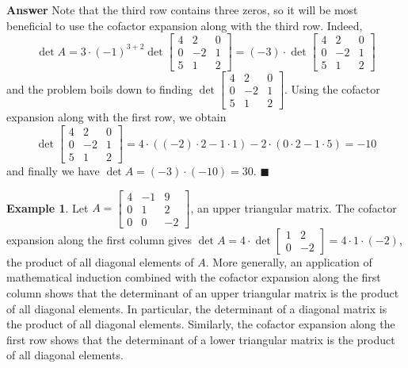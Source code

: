 \documentclass[12pt,letterpaper]{book}
\numberwithin{equation}{section}
\theoremstyle{definition}
\newtheorem{example}[thm]{\textbf{Example}}
\newenvironment{answer}{\noindent\textbf{Answer}}{\hfill$\blacksquare$\vspace{0.1in}}
\begin{document}
\begin{answer}
Note that the third row contains three zeros, so it will be most beneficial to use the cofactor expansion along with the third row. Indeed,
$$\det A=3\cdot(-1)^{3+2}\det \left[\begin{array}{rrr} 4 & 2 & 0 \\ 0 & -2 & 1 \\ 5 & 1 & 2 \end{array}\right]=(-3)\cdot\det \left[\begin{array}{rrr} 4 & 2 & 0 \\ 0 & -2 & 1 \\ 5 & 1 & 2 \end{array}\right]$$ and the problem boils down to finding $\det \left[\begin{array}{rrr} 4 & 2 & 0 \\ 0 & -2 & 1 \\ 5 & 1 & 2 \end{array}\right]$. Using the cofactor expansion along with the first row, we obtain
$$\det \left[\begin{array}{rrr} 4 & 2 & 0 \\ 0 & -2 & 1 \\ 5 & 1 & 2 \end{array}\right]=4\cdot((-2)\cdot 2 -1\cdot 1)-2\cdot(0\cdot 2 -1\cdot 5)=-10$$ and finally we have
$\det A=(-3)\cdot (-10)=30$.
\end{answer}

\begin{example}\label{triangular det}
Let $A=\left[\begin{array}{rrr} 4 & -1 & 9 \\ 0 & 1 & 2 \\ 0 & 0 & -2  \end{array}\right]$, an upper triangular matrix. The cofactor expansion along the first column gives
$\det A=4\cdot\det \left[\begin{array}{rr} 1 & 2 \\ 0 & -2  \end{array}\right]=4\cdot 1 \cdot (-2)$, the product of all diagonal elements of $A$. More generally, an application of mathematical induction combined with the cofactor expansion along the first column shows that the determinant of an upper triangular matrix is the product of all diagonal elements. In particular, the determinant of a diagonal matrix is the product of all diagonal elements. Similarly, the cofactor expansion along the first row shows that the determinant of a lower triangular matrix is the product of all diagonal elements.
\end{example}
\end{document}
